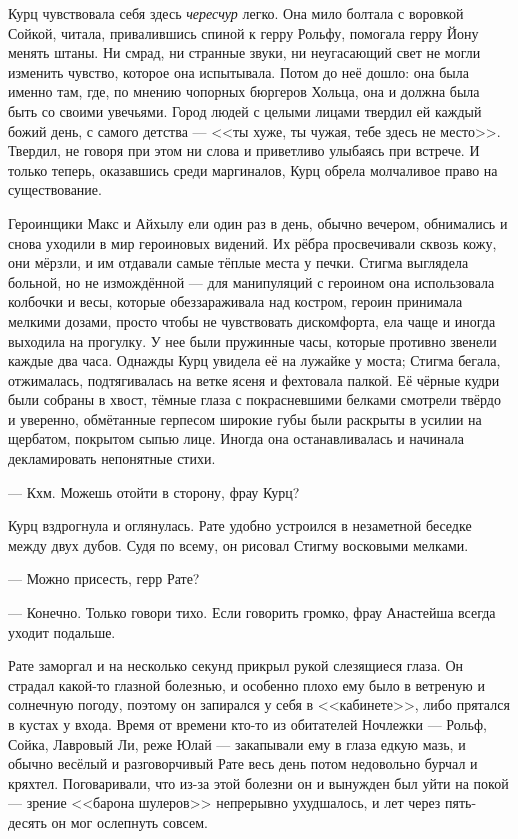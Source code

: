 Курц чувствовала себя здесь \emph{чересчур} легко.
Она мило болтала с воровкой Сойкой, читала, привалившись спиной к герру Рольфу, помогала герру Йону менять штаны.
Ни смрад, ни странные звуки, ни неугасающий свет не могли изменить чувство, которое она испытывала.
Потом до неё дошло: она была именно там, где, по мнению чопорных бюргеров Хольца, она и должна была быть со своими увечьями.
Город людей с целыми лицами твердил ей каждый божий день, с самого детства --- <<ты хуже, ты чужая, тебе здесь не место>>.
Твердил, не говоря при этом ни слова и приветливо улыбаясь при встрече.
И только теперь, оказавшись среди маргиналов, Курц обрела молчаливое право на существование.

Героинщики Макс и Айхылу ели один раз в день, обычно вечером, обнимались и снова уходили в мир героиновых видений.
Их рёбра просвечивали сквозь кожу, они мёрзли, и им отдавали самые тёплые места у печки.
Стигма выглядела больной, но не измождённой --- для манипуляций с героином она использовала колбочки и весы, которые обеззараживала над костром, героин принимала мелкими дозами, просто чтобы не чувствовать дискомфорта, ела чаще и иногда выходила на прогулку.
У нее были пружинные часы, которые противно звенели каждые два часа.
Однажды Курц увидела её на лужайке у моста;
Стигма бегала, отжималась, подтягивалась на ветке ясеня и фехтовала палкой.
Её чёрные кудри были собраны в хвост, тёмные глаза с покрасневшими белками смотрели твёрдо и уверенно, обмётанные герпесом широкие губы были раскрыты в усилии на щербатом, покрытом сыпью лице.
Иногда она останавливалась и начинала декламировать непонятные стихи.

--- Кхм.
Можешь отойти в сторону, фрау Курц?

Курц вздрогнула и оглянулась.
Рате удобно устроился в незаметной беседке между двух дубов.
Судя по всему, он рисовал Стигму восковыми мелками.

--- Можно присесть, герр Рате?

--- Конечно.
Только говори тихо.
Если говорить громко, фрау Анастейша всегда уходит подальше.

Рате заморгал и на несколько секунд прикрыл рукой слезящиеся глаза.
Он страдал какой-то глазной болезнью, и особенно плохо ему было в ветреную и солнечную погоду, поэтому он запирался у себя в <<кабинете>>, либо прятался в кустах у входа.
Время от времени кто-то из обитателей Ночлежки --- Рольф, Сойка, Лавровый Ли, реже Юлай --- закапывали ему в глаза едкую мазь, и обычно весёлый и разговорчивый Рате весь день потом недовольно бурчал и кряхтел. %
Поговаривали, что из-за этой болезни он и вынужден был уйти на покой --- зрение <<барона шулеров>> непрерывно ухудшалось, и лет через пять-десять он мог ослепнуть совсем.

